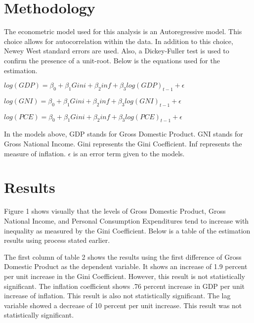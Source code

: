 \documentclass{article}
\begin{document}
\section{Methodology}
\vspace{2mm}

\quad The econometric model used for this analysis is an Autoregressive model.  This choice allows for autocorrelation within the data.  In addition to this choice, Newey West standard errors are used. Also, a Dickey-Fuller test is used to confirm the presence of a unit-root.  Below is the equations used for the estimation.  

\vspace{2mm}

\centering $log(GDP)=\beta_0+\beta_1Gini+\beta_2inf+\beta_3log(GDP)_{t-1}+\epsilon$
  \vspace{2mm}

\centering $log(GNI)=\beta_0+\beta_1Gini+\beta_2inf+\beta_3log(GNI)_{t-1}+\epsilon$
  \vspace{2mm}

\centering $log(PCE)=\beta_0+\beta_1Gini+\beta_2inf+\beta_3log(PCE)_{t-1}+\epsilon$
  \vspace{2mm}
\flushleft

\quad In the models above, GDP stands for Gross Domestic Product.  GNI stands for Gross National Income.  Gini represents the Gini Coefficient.  Inf represents the measure of inflation.  $\epsilon$ is an error term given to the models.  
\section{Results}


\vspace{2mm}



\quad Figure 1 shows visually that the levels of Gross Domestic Product, Gross National Income, and Personal Consumption Expenditures tend to increase with inequality as measured by the Gini Coefficient. Below is a table of the estimation results using process stated earlier.


\vspace{2mm}

\quad The first column of table 2 shows the results using the first difference of Gross Domestic Product as the dependent variable.  It shows an increase of 1.9 percent per unit increase in the Gini Coefficient.  However, this result is not statistically significant.  The inflation coefficient shows .76 percent increase in GDP per unit increase of inflation.  This result is also not statistically significant.  The lag variable showed a decrease of 10 percent per unit increase.  This result was not statistically significant.  
\end{document}
